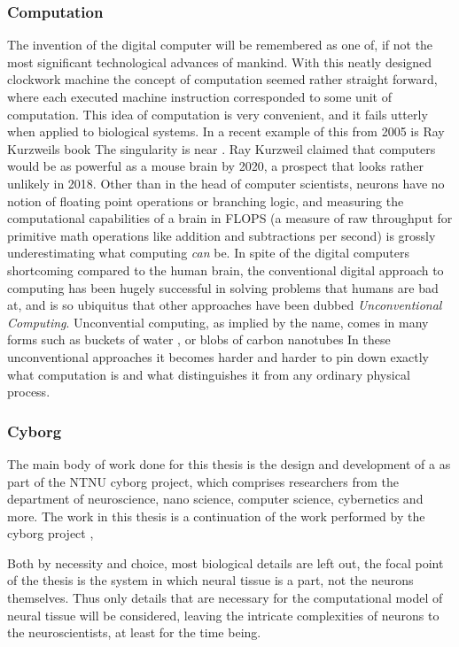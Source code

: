 \subsubsection{Computation}
The invention of the digital computer will be remembered as one of, if not the
most significant technological advances of mankind.
%
With this neatly designed clockwork machine the concept of computation seemed
rather straight forward, where each executed machine instruction corresponded to
some unit of computation.
%
This idea of computation is very convenient, and it fails utterly when
applied to biological systems.
In a recent example of this from 2005 is Ray Kurzweils book The singularity is
near \cite{KURZWEIL2005}.
Ray Kurzweil claimed that computers would be as powerful as a
mouse brain by 2020, a prospect that looks rather unlikely in 2018.
Other than in the head of computer scientists, neurons have no notion of
floating point operations or branching logic, and measuring the computational
capabilities of a brain in FLOPS (a measure of raw throughput for primitive math
operations like addition and subtractions per second) is grossly underestimating
what computing \emph{can} be.
%
In spite of the digital computers shortcoming compared to the human brain, the
conventional digital approach to computing has been hugely successful in solving
problems that humans are bad at, and is so ubiquitus that other approaches
have been dubbed \emph{Unconventional Computing}.
%
Unconvential computing, as implied by the name, comes in many forms such as
buckets of water \cite{FERNANDO2003}, or blobs of carbon nanotubes
\cite{LYKKEBOICES2014}
%
In these unconventional approaches it becomes harder and harder to pin down
exactly what computation is and what distinguishes it from any ordinary physical
process.
\subsubsection{Cyborg}
The main body of work done for this thesis is the design and development of a as
part of the NTNU cyborg project\cite{ntnu_cyborg}, which comprises
researchers from the department of neuroscience, nano science, computer science,
cybernetics and more.
The work in this thesis is a continuation of the work performed by the cyborg
project \cite{TMAC}, 


Both by necessity and choice, most biological details are left out, the focal
point of the thesis is the system in which neural tissue is a part, not the
neurons themselves.
Thus only details that are necessary for the computational model of neural
tissue will be considered, leaving the intricate complexities of neurons to the
neuroscientists, at least for the time being.
\cleardoublepage

